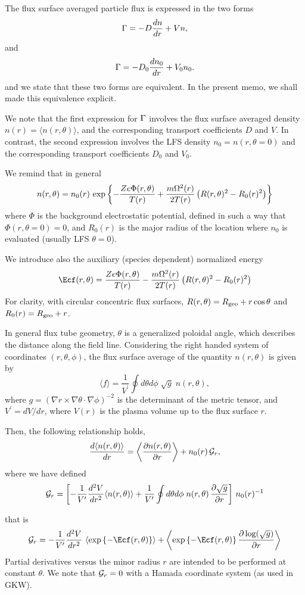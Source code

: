 The flux surface averaged particle flux is expressed in the two forms
\[ \Gamma = - D \frac {d n}{d r} + V n, \]
and
\[ \Gamma = -D_0 \frac {d n_0}{d r} + V_0 n_0. \]
and we state that these two forms are equivalent.
In the present memo, we shall made this equivalence explicit.

We note that the first expression for $\Gamma$
involves the flux surface averaged density 
$n(r) = \langle n(r,\theta) \rangle$,
and the corresponding transport coefficients $D$ and $V$.
In contrast, the second expression involves the LFS density $n_0 = n(r,\theta = 0)$
and the corresponding transport coefficients $D_0$ and $V_0$.

We remind that in general
\[ n(r,\theta) = n_0(r) \, \exp\left\{-\frac{Ze\Phi(r,\theta)}{T(r)} +\frac{m \Omega^2(r)}{2T(r)} \left(R(r,\theta)^2 - R_0(r)^2\right)\right\} \]
where $\Phi$ is the background electrostatic potential,
defined in such a way that $\Phi(r,\theta = 0) = 0$,
and $R_0(r)$ is the major radius of the location where $n_0$ is
evaluated (usually LFS $\theta = 0$).

We introduce also the auxiliary (species dependent) normalized energy
\[
\Ecf(r,\theta) = \frac{Ze\Phi(r,\theta)}{T(r)} - \frac{m \Omega^2(r)}{2T(r)} \left(R(r,\theta)^2 - R_0(r)^2\right)
\]
For clarity, with circular concentric flux surfaces,
$R(r,\theta) = R_{\rm geo}+r \cos \theta$ and $R_0(r) = R_{\rm geo}+r$.

In general flux tube geometry, $\theta$ is a generalized poloidal angle,
which describes the distance along the field line.
Considering the right handed system of coordinates $(r,\theta, \phi)$,
the flux surface average of the quantity $n(r,\theta)$ is given by
\[
\langle f \rangle = \frac{1}{V^\prime} \oint d\theta d\phi \; \sqrt{g} \; n(r, \theta),
\]
where $g = (\nabla r \times \nabla \theta \cdot \nabla \phi)^{-2}$ is
the determinant of the metric tensor, and ${V^\prime} = d V/ dr$, where
$V(r)$ is the plasma volume up to the flux surface $r$.

Then, the following relationship holds,
\[
\frac {d \langle n(r, \theta) \rangle}{d r} = 
\left \langle{ \frac {\partial n(r, \theta)}{ \partial r} } \right \rangle + n_0(r) \, {\cal G}_r,
\]
where we have defined 
\[
{\cal G}_r =  \left [ - \frac{1}{V^\prime} \frac{d^2 V}{d r ^2} \langle{n(r, \theta)}\rangle 
+ \frac{1}{V^\prime} \oint { d\theta d\phi \;  n(r, \theta) \, \frac{\partial{\sqrt{g}}}{\partial r}}
\right ] \, n_0(r)^{-1}
\]

that is
\[
\calGr =  - \frac{1}{V^\prime} \frac{d^2 V}{d r ^2} \, \left \langle \expargs \right \rangle 
+ \left \langle \expargs \frac{\partial \log(\sqrt{g})}{\partial r} \right \rangle
\]
Partial derivatives versus the minor radius $r$ are intended to 
be performed at constant $\theta$.
We note that ${\cal G}_r = 0$ with a Hamada coordinate system 
(as used in GKW).

